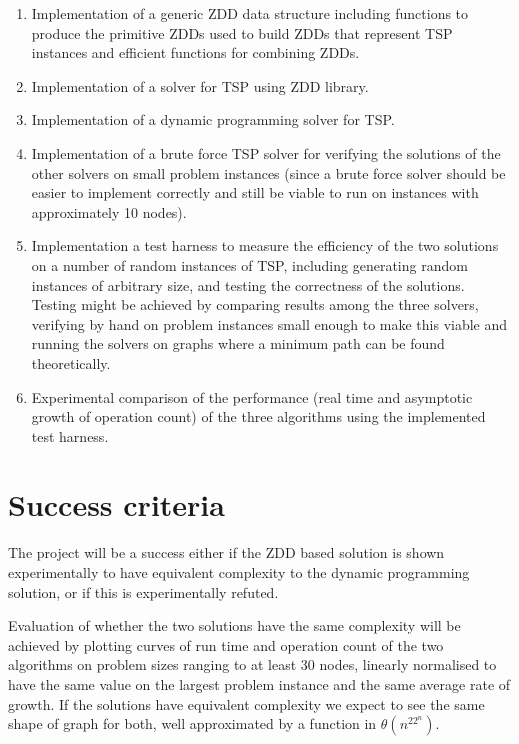 \documentclass[12pt,a4paper,twoside]{article}
\begin{document}
\begin{enumerate}

\item Implementation of a generic ZDD data structure including functions to produce the primitive ZDDs used to build ZDDs that represent TSP instances and efficient functions for combining ZDDs.

\item Implementation of a solver for TSP using ZDD library.

\item Implementation of a dynamic programming solver for TSP.

\item Implementation of a brute force TSP solver for verifying the solutions of the other solvers on small problem instances (since a brute force solver should be easier to implement correctly and still be viable to run on instances with approximately 10 nodes).

\item Implementation a test harness to measure the efficiency of the two solutions on a number of random instances of TSP, including generating random instances of arbitrary size, and testing the correctness of the solutions. Testing might be achieved by comparing results among the three solvers, verifying by hand on problem instances small enough to make this viable and running the solvers on graphs where a minimum path can be found theoretically.

\item Experimental comparison of the performance (real time and asymptotic growth of operation count) of the three algorithms using the implemented test harness.

\end{enumerate}

\section*{Success criteria}

The project will be a success either if the ZDD based solution is shown experimentally to have equivalent complexity to the dynamic programming solution, or if this is experimentally refuted.

Evaluation of whether the two solutions have the same complexity will be achieved by plotting curves of run time and operation count of the two algorithms on problem sizes ranging to at least 30 nodes, linearly normalised to have the same value on the largest problem instance and the same average rate of growth. If the solutions have equivalent complexity we expect to see the same shape of graph for both, well approximated by a function in $\theta(n^22^n)$.
\end{document}
